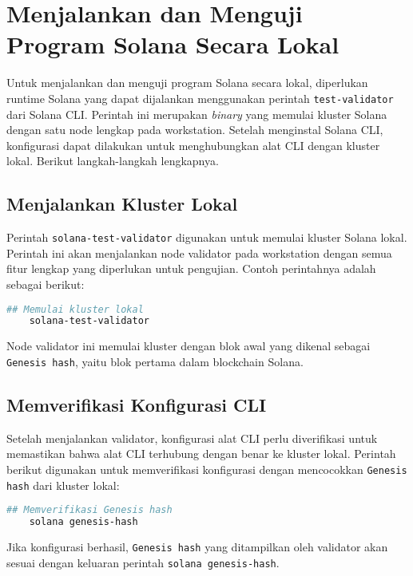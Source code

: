 \chapter{Menjalankan dan Menguji Program Solana Secara Lokal}

Untuk menjalankan dan menguji program Solana secara lokal, diperlukan runtime Solana yang dapat dijalankan menggunakan perintah \texttt{test-validator} dari Solana CLI. Perintah ini merupakan \textit{binary} yang memulai kluster Solana dengan satu node lengkap pada workstation. Setelah menginstal Solana CLI, konfigurasi dapat dilakukan untuk menghubungkan alat CLI dengan kluster lokal. Berikut langkah-langkah lengkapnya.

\section{Menjalankan Kluster Lokal}

Perintah \texttt{solana-test-validator} digunakan untuk memulai kluster Solana lokal. Perintah ini akan menjalankan node validator pada workstation dengan semua fitur lengkap yang diperlukan untuk pengujian. Contoh perintahnya adalah sebagai berikut:
\begin{lstlisting}[language=bash, caption={Menjalankan Kluster Lokal}]
	## Memulai kluster lokal
	solana-test-validator
\end{lstlisting}

Node validator ini memulai kluster dengan blok awal yang dikenal sebagai \texttt{Genesis hash}, yaitu blok pertama dalam blockchain Solana.

\section{Memverifikasi Konfigurasi CLI}

Setelah menjalankan validator, konfigurasi alat CLI perlu diverifikasi untuk memastikan bahwa alat CLI terhubung dengan benar ke kluster lokal. Perintah berikut digunakan untuk memverifikasi konfigurasi dengan mencocokkan \texttt{Genesis hash} dari kluster lokal:
\begin{lstlisting}[language=bash, caption={Memverifikasi Konfigurasi CLI}]
	## Memverifikasi Genesis hash
	solana genesis-hash
\end{lstlisting}

Jika konfigurasi berhasil, \texttt{Genesis hash} yang ditampilkan oleh validator akan sesuai dengan keluaran perintah \texttt{solana genesis-hash}.

